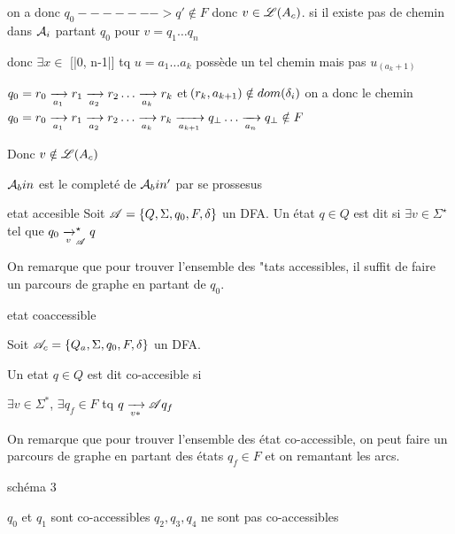 \documentclass[a4paper,french,bookmarks]{book}
\begin{document}
\begin{nproof}
\begin{enumerate}
            on a donc $q_0 -------> q' \notin F $ donc $v \in \mathscr{L}(A_c)$.
            \itt si il existe pas de chemin dans $\mathcal{A}_i$ partant $q_0$ pour $v=q_1 \dots q_n$
        
        donc $\exists x \in $ [|0, n-1|] tq $u=a_1 \dots a_k$ possède un tel chemin mais pas $u_(a_k+1)$
        \end{enumerate}
        
        $q_0 = r_0 \lima{a_1} r_1 \lima{a_2} r_2 \dots \lima{a_k} r_k$ et $\!\left(r_k, a_{k+1}\right) \notin dom \!\left(\delta_i\right)$
        on a donc le chemin
        $q_0 = r_0 \lima{a_1} r_1 \lima{a_2} r_2 \dots \lima{a_k} r_k \lima{a_{k+1}} q_\bot \dots \lima{a_n} q_\bot \notin F$
            
        
        Donc $v \notin \mathscr{L}(A_c)$
    \end{nproof}
    
    
    
    \begin{example}{}{}
        $\mathcal{A}_bin$ est le completé de $\mathcal{A}_bin'$
        par se prossesus 
        
    \end{example}
    
    \begin{definition}{etat accesible}{}
        Soit $\mathscr{A} = \left\{Q, \Sigma, q_0, F, \delta\right\}$ un DFA.
        Un état $q \in Q$ est dit  si $\exists v \in \Sigma^\star$ tel que $q_0 \lima{v}_\bsA^\star q$
    \end{definition}
    
    On remarque que pour trouver l'ensemble des "tats accessibles, il suffit de faire un parcours de graphe en partant de $q_0$.
    
    \begin{definition}{etat coaccessible}{}
        
        Soit $\mathscr{A}_c = \left\{Q_a, \Sigma, q_0, F, \delta\right\}$ un DFA.
        
        Un etat $q\in Q$ est dit co-accesible si 
        
        $\exists v \in \Sigma^*$, $\exists q_f \in F $ tq $ q \lima{v *}{\bsA} q_f$
        
    \end{definition}
    
    On remarque que pour trouver l'ensemble des état co-accessible, on peut faire un parcours de graphe en partant des états $q_f \in F $ et on remantant les arcs.
    
    \begin{example}{}{}
        \text{}\newline
        schéma 3 \newline
        
        \begin{enumerate}
            \itt $q_0$ et $q_1$ sont co-accessibles
            \itt $q_2, q_3, q_4$ ne sont pas co-accessibles
        \end{enumerate}
    \end{example}
    
\end{document}
